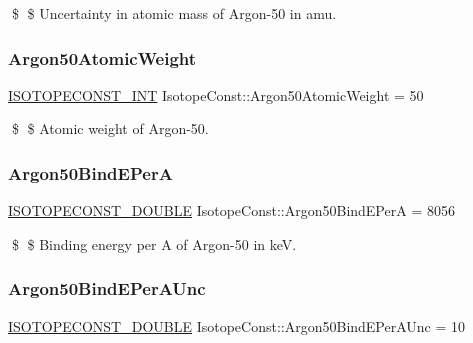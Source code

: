 \$ \$ Uncertainty in atomic mass of Argon-\/50 in amu. \mbox{\label{group___isotope_const-_argon-_ar50_ga3542b2421cd53ba32cc6745435bb3b50}} 
\subsubsection{\texorpdfstring{Argon50\+Atomic\+Weight}{Argon50AtomicWeight}}
{\footnotesize\ttfamily \mbox{\hyperlink{group___isotope_const-_macros_ga5f18360b3e99483a35c32d789e62621c}{I\+S\+O\+T\+O\+P\+E\+C\+O\+N\+S\+T\+\_\+\+I\+NT}} Isotope\+Const\+::\+Argon50\+Atomic\+Weight = 50}

\$ \$ Atomic weight of Argon-\/50. \mbox{\label{group___isotope_const-_argon-_ar50_gab86628f473be7f1fe03cf0efe174c1ad}} 
\subsubsection{\texorpdfstring{Argon50\+Bind\+E\+PerA}{Argon50BindEPerA}}
{\footnotesize\ttfamily \mbox{\hyperlink{group___isotope_const-_macros_ga8f45a7272ce02c0b4c65c44636ed719a}{I\+S\+O\+T\+O\+P\+E\+C\+O\+N\+S\+T\+\_\+\+D\+O\+U\+B\+LE}} Isotope\+Const\+::\+Argon50\+Bind\+E\+PerA = 8056}

\$ \$ Binding energy per A of Argon-\/50 in keV. \mbox{\label{group___isotope_const-_argon-_ar50_ga03fe51412c8b2bb8d7e43bb5066938bd}} 
\subsubsection{\texorpdfstring{Argon50\+Bind\+E\+Per\+A\+Unc}{Argon50BindEPerAUnc}}
{\footnotesize\ttfamily \mbox{\hyperlink{group___isotope_const-_macros_ga8f45a7272ce02c0b4c65c44636ed719a}{I\+S\+O\+T\+O\+P\+E\+C\+O\+N\+S\+T\+\_\+\+D\+O\+U\+B\+LE}} Isotope\+Const\+::\+Argon50\+Bind\+E\+Per\+A\+Unc = 10}

